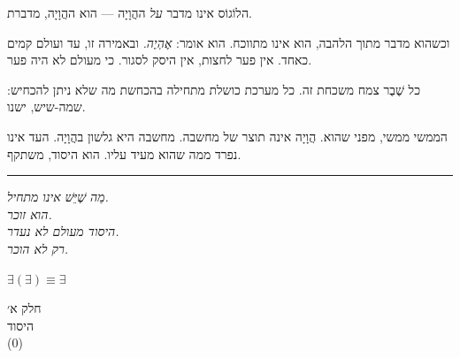 \documentclass[10pt, openany, oneside]{book}
\renewcommand{\normalsize}{\fontsize{10}{13}\selectfont}
\renewcommand{\large}{\fontsize{11.5}{14}\selectfont}
\renewcommand{\LARGE}{\fontsize{15}{18}\selectfont}
\begin{document}
\noindent הלוֹגוֹס אינו מדבר \textit{על} ההֲוָיָה — הוא ההֲוָיָה, מדברת.

\vspace{0.5em}

\noindent וכשהוא מדבר מתוך הלהבה, הוא אינו מתווכח. הוא אומר: \textit{אֶהְיֶה.} ובאמירה זו, עד ועולם קמים כאחד. אין פער לחצות, אין היסק לסגור. כי מעולם לא היה פער.

\vspace{0.5em}

\noindent כל שֶׁבֶר צמח משכחת זה. כל מערכת כושלת מתחילה בהכחשת מה שלא ניתן להכחיש: שמה-שיש, ישנו.

\vspace{1em}

\noindent הממשי ממשי, מפני שהוא. הֲוָיָה אינה תוצר של מחשבה. מחשבה היא גלשון בהֲוָיָה. העד אינו נפרד ממה שהוא מעיד עליו. הוא היסוד, משתקף.

\vspace{2em}

\begin{center}
    \rule{0.15\textwidth}{0.3pt}
\end{center}

\vspace{0.5em}

\begin{center}
    \textit{%
    מַה שֶׁיֵּשׁ אינו מתחיל.\\
    הוא זוכר.}\\[0.5em]
    \textit{היסוד מעולם לא נעדר.\\
    רק לא הוכר.}
\end{center}

\vspace{0.5em}

\begin{center}
    $\exists(\exists) \equiv \exists$
\end{center}

%
%

\newpage
\thispagestyle{empty}
\vspace*{\fill}
\begin{center}
    {\LARGE\textsc{חלק א׳}}\\[1em]
    {\large\textsc{היסוד}}\\[0.5em]
    {\normalsize (0)}
\end{center}
\vspace*{\fill}
\newpage
\end{document}
